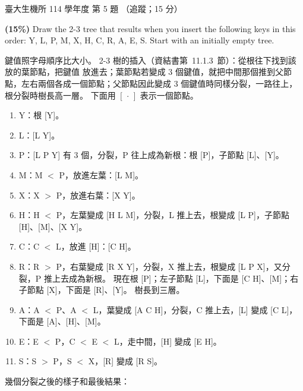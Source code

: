 \begin{pastexam}[label={px:ntu-114-bime-ds-05}]{臺大生機所 114 學年度 第 5 題}
（追蹤；15 分）

\textbf{(15\%)} Draw the 2-3 tree that results when you insert the following keys in this order: Y,
L, P, M, X, H, C, R, A, E, S. Start with an initially empty tree.
\end{pastexam}

\begin{pastsoln}
鍵值照字母順序比大小。 2-3 樹的插入（資結書第~11.1.3~節）：從根往下找到該放的葉節點，把鍵值
放進去；葉節點若變成 $3$ 個鍵值，就把中間那個推到父節點，左右兩個各成一個節點；父節點因此變成
$3$ 個鍵值時同樣分裂，一路往上，根分裂時樹長高一層。 下面用 $[\,\cdot\,]$ 表示一個節點。

\begin{enumerate}
\item Y：根 [Y]。
\item L：[L Y]。
\item P：[L P Y] 有 $3$ 個，分裂，P 往上成為新根：根 [P]，子節點 [L]、[Y]。
\item M：M $<$ P，放進左葉：[L M]。
\item X：X $>$ P，放進右葉：[X Y]。
\item H：H $<$ P，左葉變成 [H L M]，分裂，L 推上去，根變成 [L P]，子節點 [H]、[M]、[X Y]。
\item C：C $<$ L，放進 [H]：[C H]。
\item R：R $>$ P，右葉變成 [R X Y]，分裂，X 推上去，根變成 [L P X]，又分裂，P 推上去成為新根。
現在根 [P]；左子節點 [L]，下面是 [C H]、[M]；右子節點 [X]，下面是 [R]、[Y]。 樹長到三層。
\item A：A $<$ P、A $<$ L，葉變成 [A C H]，分裂，C 推上去，[L] 變成 [C L]，下面是 [A]、[H]、[M]。
\item E：E $<$ P，C $<$ E $<$ L，走中間，[H] 變成 [E H]。
\item S：S $>$ P，S $<$ X，[R] 變成 [R S]。
\end{enumerate}

幾個分裂之後的樣子和最後結果：
\begin{center}


\end{center}
\end{pastsoln}
